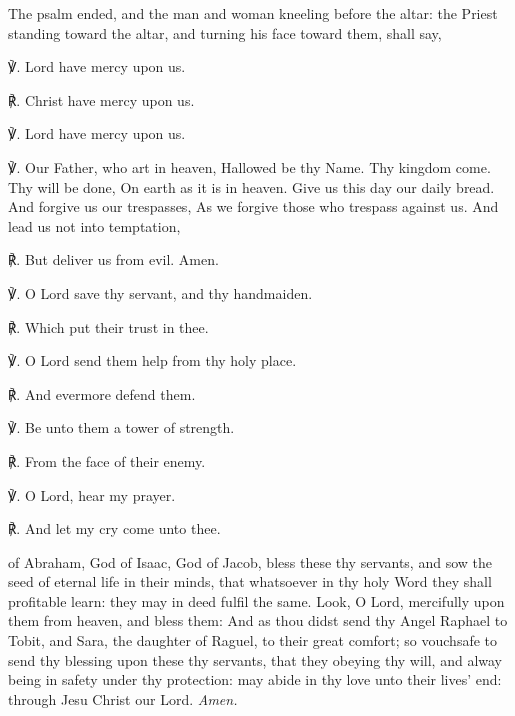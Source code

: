 \clearpage
\begin{rubric}
	The psalm ended, and the man and woman kneeling before the altar: the Priest standing toward the altar, and turning his face toward them, shall say,
\end{rubric}
℣. Lord have mercy upon us.\par
℟. Christ have mercy upon us.\par
℣. Lord have mercy upon us.\par
℣. Our Father, who art in heaven, Hallowed be thy Name. Thy kingdom come. Thy will be done, On earth as it is in heaven. Give us this day our daily bread. And forgive us our trespasses, As we forgive those who trespass against us. And lead us not into temptation,\par
℟. But deliver us from evil. Amen.\par
℣. O Lord save thy servant, and thy handmaiden.\par
℟. Which put their trust in thee.\par
℣. O Lord send them help from thy holy place.\par
℟. And evermore defend them.\par
℣. Be unto them a tower of strength.\par
℟. From the face of their enemy.\par
℣. O Lord, hear my prayer.\par
℟. And let my cry come unto thee.\par
{}
{} of Abraham, God of Isaac, God of Jacob, bless these thy servants, and sow the seed of eternal life in their minds, that whatsoever in thy holy Word they shall profitable learn: they may in deed fulfil the same. Look, O Lord, mercifully upon them from heaven, and bless them: And as thou didst send thy Angel Raphael to Tobit, and Sara, the daughter of Raguel, to their great comfort; so vouchsafe to send thy blessing upon these thy servants, that they obeying thy will, and alway being in safety under thy protection: may abide in thy love unto their lives' end: through Jesu Christ our Lord. \textit{Amen.}

